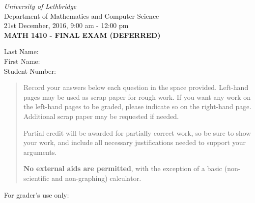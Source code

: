 \documentclass[12pt]{article}
\newcommand{\skipline}{\vspace{12pt}}
\begin{document}
\author{Instructor: Sean Fitzpatrick}
\thispagestyle{plain}
\begin{center}
\emph{University of Lethbridge}\\
Department of Mathematics and Computer Science\\
21st December, 2016, 9:00 am - 12:00 pm\\
{\bf MATH 1410 - FINAL EXAM (DEFERRED)}\\
\end{center}
\skipline \skipline \skipline \noindent \skipline
Last Name:\underline{\hspace{350pt}}\\
\skipline
First Name:\underline{\hspace{348pt}}\\
\skipline
Student Number:\underline{\hspace{322pt}}\\


\vspace{0.1in}


\begin{quote}

 
 Record your answers below each question in the space provided.    Left-hand pages may be used as scrap paper for rough work.  If you want any work on the left-hand pages to be graded, please indicate so on the right-hand page. Additional scrap paper may be requested if needed.
 
 \bigskip
 
 Partial credit will be awarded for partially correct work, so be sure to show your work, and include all necessary justifications needed to support your arguments. 

\bigskip

 \textbf{No external aids are permitted}, with the exception of a basic (non-scientific and non-graphing) calculator.
\end{quote}


\vspace{0.2in}

For grader's use only:
\end{document}
